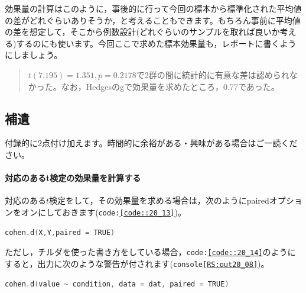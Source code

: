 \documentclass{ltjsbook}
\begin{document}
効果量の計算はこのように，事後的に行って今回の標本から標準化された平均値の差がどれぐらいありそうか，と考えることもできます。もちろん事前に平均値の差を想定して，そこから例数設計(どれぐらいのサンプルを取れば良いか考える)するのにも使います。今回ここで求めた標本効果量も，レポートに書くようにしましょう。

\begin{quote}
    $t(7.195)=1.351,p = 0.2178$で2群の間に統計的に有意な差は認められなかった。なお，Hedgesのgで効果量を求めたところ，0.77であった。
\end{quote}

\subsection{補遺}
付録的に2点付け加えます。時間的に余裕がある・興味がある場合はご一読ください。
\paragraph{対応のあるt検定の効果量を計算する}対応のある$t$検定をして，その効果量を求める場合は，次のようにpairedオプションをオンにしておきます(\texttt{code:\ref{code::20_13}})。

\begin{lstlisting}[language=c++,label={code::20_13},caption={cohenのd}]
cohen.d(X,Y,paired = TRUE)
\end{lstlisting}
ただし，チルダを使った書き方をしている場合，\texttt{code:\ref{code::20_14}}のようにすると，出力に次のような警告が付されます(\texttt{console\ref{RS:out20_08}})。
\begin{lstlisting}[language=c++,label={code::20_14},caption={cohenのdその2}]
cohen.d(value ~ condition, data = dat, paired = TRUE)
\end{lstlisting}
\end{document}
